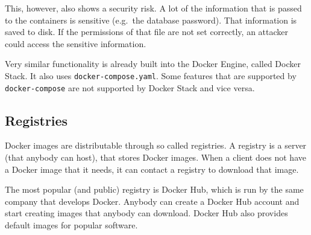 This, however, also shows a security risk. A lot of the information that is passed to the containers is sensitive (e.g.\ the database password). That information is saved to disk. If the permissions of that file are not set correctly, an attacker could access the sensitive information.

\hfill

Very similar functionality is already built into the Docker Engine, called Docker Stack. It also uses \lstinline{docker-compose.yaml}. Some features that are supported by \lstinline{docker-compose} are not supported by Docker Stack and vice versa.

\subsection{Registries}

Docker images are distributable through so called registries. A registry is a server (that anybody can host), that stores Docker images. When a client does not have a Docker image that it needs, it can contact a registry to download that image.

\hfill

The most popular (and public) registry is Docker Hub, which is run by the same company that develops Docker.
Anybody can create a Docker Hub account and start creating images that anybody can download. Docker Hub also provides default images for popular software.
